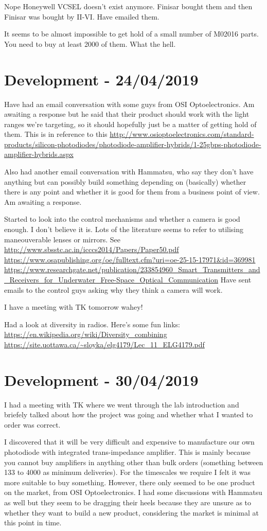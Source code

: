 Nope Honeywell VCSEL doesn't exist anymore. Finisar bought them and then Finisar
was bought by II-VI. Have emailed them.

It seems to be almost impossible to get hold of a small number of M02016 parts.
You need to buy at least 2000 of them. What the hell.

\section{Development - 24/04/2019}
Have had an email conversation with some guys from OSI Optoelectronics.
Am awaiting a response but he said that their product should work with the
light ranges we're targeting, so it should hopefully just be a matter of getting
hold of them. This is in reference to this
\url{http://www.osioptoelectronics.com/standard-products/silicon-photodiodes/photodiode-amplifier-hybrids/1-25gbps-photodiode-amplifier-hybrids.aspx}

Also had another email conversation with Hammatsu, who say they don't have
anything but can possibly build something depending on (basically) whether there
is any point and whether it is good for them from a business point of view.
Am awaiting a response.

Started to look into the control mechanisms and whether a camera is good
enough. I don't believe it is. Lots of the literature seems to refer to
utilising maneouverable lenses or mirrors. See
\url{http://www.sbsstc.ac.in/icccs2014/Papers/Paper50.pdf}
\url{https://www.osapublishing.org/oe/fulltext.cfm?uri=oe-25-15-17971&id=369981}
\url{https://www.researchgate.net/publication/233854960_Smart_Transmitters_and_Receivers_for_Underwater_Free-Space_Optical_Communication}
Have sent emails to the control guys asking why they think a camera will
work.

I have a meeting with TK tomorrow wahey!

Had a look at diversity in radios. Here's some fun links:
\url{https://en.wikipedia.org/wiki/Diversity_combining}
\url{https://site.uottawa.ca/~sloyka/elg4179/Lec_11_ELG4179.pdf}

\section{Development - 30/04/2019}
I had a meeting with TK where we went through the lab introduction
and briefely talked about how the project was going and whether what
I wanted to order was correct.

I discovered that it will be very difficult and expensive to manufacture
our own photodiode with integrated trans-impedance amplifier. This
is mainly because you cannot buy amplifiers in anything other than
bulk orders (something between 133 to 4000 as minimum deliveries). For
the timescales we require I felt it was more suitable to buy something.
However, there only seemed to be one product on the market, from
OSI Optoelectronics. I had some discussions with Hammatsu as well but
they seem to be dragging their heels because they are unsure as to whether
they want to build a new product, considering the market is minimal at
this point in time.

